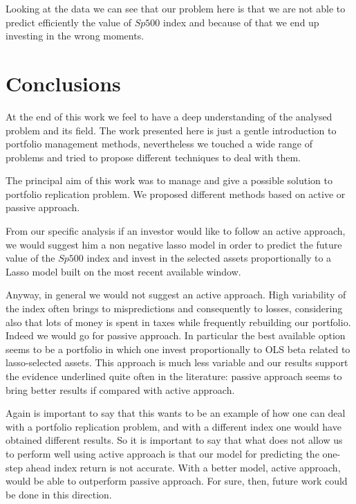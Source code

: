 \documentclass{article}%
\begin{document}
Looking at the data we can see that our problem here is that we are not able to predict efficiently the value of $Sp500$ index and because of that we end up investing in the wrong moments.



\section{Conclusions}

At the end of this work we feel to have a deep understanding of the analysed problem and its field. The work presented here is just a gentle introduction to portfolio management methods, nevertheless we touched a wide range of problems and tried to propose different techniques to deal with them.


The principal aim of this work was to manage and give a possible solution to portfolio replication problem. We  proposed different methods based on active or passive approach.

From our specific analysis if an investor would like to follow an active approach, we would suggest him a non negative lasso model in order to predict the future value of the $Sp500$ index and invest in the selected assets proportionally to a Lasso model built on the most recent available window.

Anyway, in general we would not suggest an active approach. High variability of the index often brings to mispredictions and consequently to losses, considering also that lots of money is spent in taxes while frequently rebuilding our portfolio. Indeed we would go for passive approach. In particular the best available option seems to be a portfolio in which one invest proportionally to OLS beta related to lasso-selected assets.
This approach is much less variable and our results support the evidence underlined quite often in the literature: passive approach seems to bring better results if compared with active approach. 


Again is important to say that this wants to be an example of how one can deal with a portfolio replication problem, and with a different index one would have obtained different results. So it is important to say that what does not allow us to perform well using active approach is that our model for predicting the one-step ahead index return is not accurate. With a better model, active approach, would be able to outperform passive approach. For sure, then, future work could be done in this direction.
\end{document}
